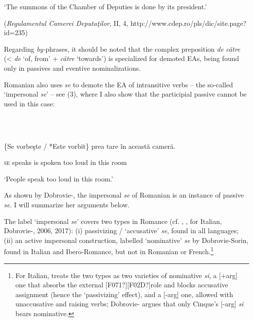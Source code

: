 \documentclass[output=paper]{langsci/langscibook}
\begin{document}
\begin{styleDSb}
     ‘The summons of the Chamber of Deputies is done by its president.’
\end{styleDSb}

\begin{styleDSb}
(\textit{Regulamentul Camerei Deputaţilor}, II, 4, http://www.cdep.ro/pls/dic/site.page?id=235)
\end{styleDSb}

Regarding \textit{by-}phrases, it should be noted that the complex preposition \textit{de către} (< \textit{de} ‘of, from’ + \textit{către} ‘towards’) is specialized for demoted EAs, being found only in passives and eventive nominalizations.

Romanian also uses \textit{se} to demote the EA of intransitive verbs – the so-called ‘impersonal \textit{se}’ – see (3), where I also show that the participial passive cannot be used in this case:

\ea%
    \label{ex:key:3}
    \gll\\
        \\
    \glt
    \z

          \{Se vorbeşte / *Este vorbit\} prea tare în această cameră. 

\begin{styleDSb}
  \textsc{se} speaks       is      spoken too  loud in this       room
\end{styleDSb}

           ‘People speak too loud in this room.’

As shown by Dobrovie-\citet{Sorin1998}, the impersonal \textit{se} of Romanian is an instance of passive \textit{se}. I will summarize her arguments below.

The label ‘impersonal \textit{se}’ covers two types in Romance (cf. \citealt{Belletti1982}, \citealt{Manzini1986}, \citealt{Burzio1986} for Italian, Dobrovie-\citealt{Sorin1998}, 2006, 2017): (i) passivizing / ‘accusative’ \textit{se}, found in all languages; (ii) an active impersonal construction, labelled ‘nominative’ \textit{se} by Dobrovie-Sorin, found in Italian and Ibero-Romance, but not in Romanian or French.\footnote{For Italian, \citet{Cinque1988} treats the two types as two varieties of nominative \textit{si}, a [+arg] one that absorbs the external [F071?][F02D?]role and blocks accusative assignment (hence the ‘passivizing’ effect), and a [-arg] one, allowed with unaccusative and  raising verbs; Dobrovie-\citet{Sorin1998} argues that only Cinque’s [-arg] \textit{si} bears nominative.} 
\end{document}
